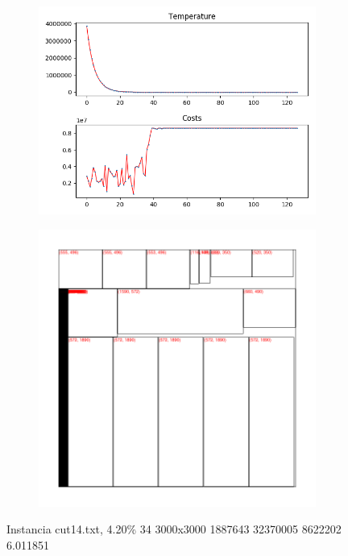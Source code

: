 \begin{figure}
\centering
\begin{subfigure}{.5\textwidth}
  \centering
  \includegraphics[width=1\linewidth]{results/cut14/2/plot}
  \label{fig:sub1}
\end{subfigure}%
\begin{subfigure}{.5\textwidth}
  \centering
  \includegraphics[width=1\linewidth]{results/cut14/2/cut}
  \label{fig:sub2}
\end{subfigure}
\caption{Instancia cut14.txt, 4.20\% 34 3000x3000 1887643 32370005 8622202 6.011851}
\label{fig:test}
\end{figure}


